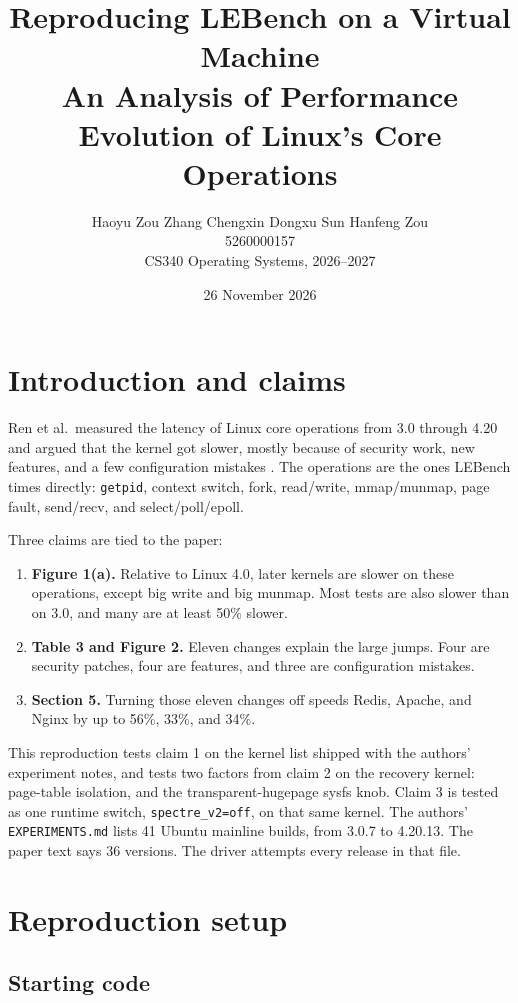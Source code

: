 \documentclass[11pt]{article}
\title{Reproducing LEBench on a Virtual Machine\\
\large An Analysis of Performance Evolution of Linux's Core Operations}
\author{Haoyu Zou \quad Zhang Chengxin \quad Dongxu Sun \quad Hanfeng Zou\\
5260000157 \quad 1240016541 \quad 5260000073 \quad 1240020460\\
CS340 Operating Systems, 2026--2027}
\date{26 November 2026}
\begin{document}
\maketitle

\section{Introduction and claims}

Ren et al.\ measured the latency of Linux core operations from 3.0 through 4.20 and argued that the kernel got slower, mostly because of security work, new features, and a few configuration mistakes \cite{ren2019lebench}. The operations are the ones LEBench times directly: \texttt{getpid}, context switch, fork, read/write, mmap/munmap, page fault, send/recv, and select/poll/epoll.

Three claims are tied to the paper:

\begin{enumerate}
\item \textbf{Figure 1(a).} Relative to Linux 4.0, later kernels are slower on these operations, except big write and big munmap. Most tests are also slower than on 3.0, and many are at least 50\% slower.
\item \textbf{Table 3 and Figure 2.} Eleven changes explain the large jumps. Four are security patches, four are features, and three are configuration mistakes.
\item \textbf{Section 5.} Turning those eleven changes off speeds Redis, Apache, and Nginx by up to 56\%, 33\%, and 34\%.
\end{enumerate}

This reproduction tests claim 1 on the kernel list shipped with the authors' experiment notes, and tests two factors from claim 2 on the recovery kernel: page-table isolation, and the transparent-hugepage sysfs knob. Claim 3 is tested as one runtime switch, \texttt{spectre\_v2=off}, on that same kernel. The authors' \texttt{EXPERIMENTS.md} lists 41 Ubuntu mainline builds, from 3.0.7 to 4.20.13. The paper text says 36 versions. The driver attempts every release in that file.

\section{Reproduction setup}

\subsection{Starting code}
\end{document}
